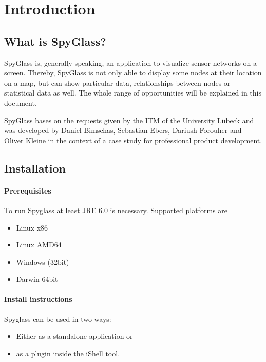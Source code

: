 \section{Introduction}
\label{section:s_introduction}

\subsection{What is SpyGlass?}
SpyGlass is, generally speaking, an application to visualize sensor networks on a screen. Thereby, SpyGlass is not only able to display some nodes at their location on a map, but can show particular data, relationships between nodes or statistical data as well.
The whole range of opportunities will be explained in this document.

SpyGlass bases on the requests given by the ITM of the University L\"ubeck and was developed by Daniel Bimschas, Sebastian Ebers,
Dariush Forouher and Oliver Kleine in the context of a case study for professional product development.

\subsection{Installation}

\paragraph{Prerequisites}

To run Spyglass at least JRE 6.0 is necessary. Supported platforms are

\begin{itemize}
  \item{Linux x86}
  \item{Linux AMD64}
  \item{Windows (32bit)}
  \item{Darwin 64bit}
\end{itemize}

\paragraph{Install instructions}

Spyglass can be used in two ways:

\begin{itemize}
  \item{Either as a standalone application or}
  \item{as a plugin inside the iShell tool.}
\end{itemize}

